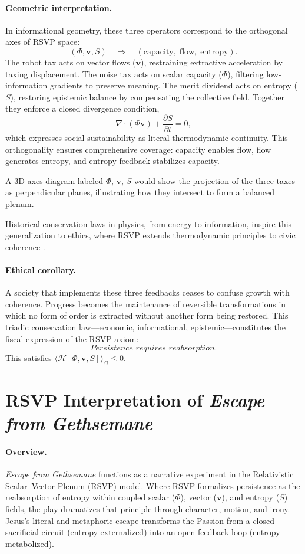 \documentclass[12pt]{article}
\begin{document}
\paragraph{Geometric interpretation.}
In informational geometry, these three operators correspond to the orthogonal axes of RSVP space:
\[
(\Phi, \mathbf{v}, S) \quad \Rightarrow \quad (\text{capacity},\; \text{flow},\; \text{entropy}).
\]
The robot tax acts on vector flows ($\mathbf{v}$), restraining extractive acceleration by taxing displacement. The noise tax acts on scalar capacity ($\Phi$), filtering low-information gradients to preserve meaning. The merit dividend acts on entropy ($S$), restoring epistemic balance by compensating the collective field. Together they enforce a closed divergence condition,
\[
\nabla\!\cdot(\Phi \mathbf{v}) + \frac{\partial S}{\partial t} = 0,
\]
which expresses social sustainability as literal thermodynamic continuity. This orthogonality ensures comprehensive coverage: capacity enables flow, flow generates entropy, and entropy feedback stabilizes capacity.

A 3D axes diagram labeled $\Phi$, $\mathbf{v}$, $S$ would show the projection of the three taxes as perpendicular planes, illustrating how they intersect to form a balanced plenum.

Historical conservation laws in physics, from energy to information, inspire this generalization to ethics, where RSVP extends thermodynamic principles to civic coherence \citep{jaynes1957information}.

\paragraph{Ethical corollary.}
A society that implements these three feedbacks ceases to confuse growth with coherence. Progress becomes the maintenance of reversible transformations in which no form of order is extracted without another form being restored. This triadic conservation law—economic, informational, epistemic—constitutes the fiscal expression of the RSVP axiom:
\[
\textit{Persistence requires reabsorption.}
\]
This satisfies $\langle \mathcal{H}[\Phi,\mathbf{v},S] \rangle_\Omega \le 0$.

\section{RSVP Interpretation of \emph{Escape from Gethsemane}}
\label{sec:gethsemane-rsvp}

\paragraph{Overview.}
\emph{Escape from Gethsemane} functions as a narrative experiment in the Relativistic Scalar--Vector Plenum (RSVP) model.  
Where RSVP formalizes persistence as the reabsorption of entropy within coupled scalar (\(\Phi\)), vector (\(\mathbf v\)), and entropy (\(S\)) fields, the play dramatizes that principle through character, motion, and irony.  
Jesus’s literal and metaphoric escape transforms the Passion from a closed sacrificial circuit (entropy externalized) into an open feedback loop (entropy metabolized).
\end{document}
